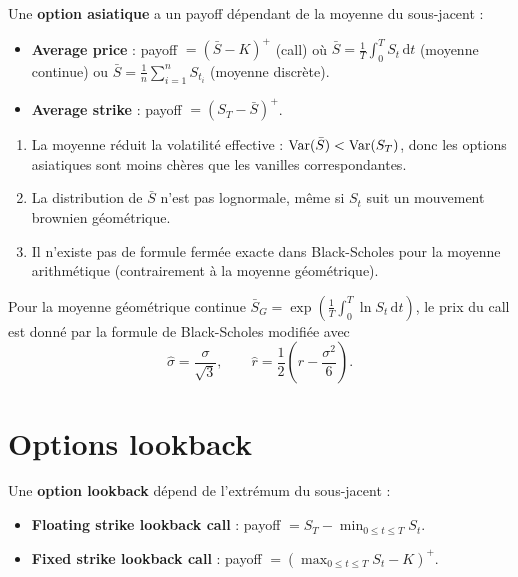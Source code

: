 \begin{definition}
Une \textbf{option asiatique} a un payoff d\'ependant de la moyenne du
sous-jacent :
\begin{itemize}
    \item \textbf{Average price} : payoff $= \left(\bar{S} - K\right)^+$
    (call) o\`u $\bar{S} = \frac{1}{T}\int_0^T S_t\,\mathrm{d}t$ (moyenne
    continue) ou $\bar{S} = \frac{1}{n}\sum_{i=1}^n S_{t_i}$ (moyenne
    discr\`ete).
    \item \textbf{Average strike} : payoff $= \left(S_T - \bar{S}\right)^+$.
\end{itemize}
\end{definition}

\begin{proposition}
\begin{enumerate}
    \item La moyenne r\'eduit la volatilit\'e effective :
    $\mathrm{Var}(\bar{S}) < \mathrm{Var}(S_T)$, donc les options asiatiques sont moins
    ch\`eres que les vanilles correspondantes.
    \item La distribution de $\bar{S}$ n'est pas lognormale, m\^eme si $S_t$
    suit un mouvement brownien g\'eom\'etrique.
    \item Il n'existe pas de formule ferm\'ee exacte dans Black-Scholes pour
    la moyenne arithm\'etique (contrairement \`a la moyenne g\'eom\'etrique).
\end{enumerate}
\end{proposition}

\begin{theoreme}
Pour la moyenne g\'eom\'etrique continue
$\bar{S}_G = \exp\!\left(\frac{1}{T}\int_0^T \ln S_t\,\mathrm{d}t\right)$,
le prix du call est donn\'e par la formule de Black-Scholes modifi\'ee avec
\[
    \hat{\sigma} = \frac{\sigma}{\sqrt{3}}, \qquad
    \hat{r} = \frac{1}{2}\left(r - \frac{\sigma^2}{6}\right).
\]
\end{theoreme}

\section{Options lookback}

\begin{definition}
Une \textbf{option lookback} d\'epend de l'extr\'emum du sous-jacent :
\begin{itemize}
    \item \textbf{Floating strike lookback call} :
    payoff $= S_T - \min_{0 \leq t \leq T} S_t$.
    \item \textbf{Fixed strike lookback call} :
    payoff $= \left(\max_{0 \leq t \leq T} S_t - K\right)^+$.
\end{itemize}
\end{definition}

